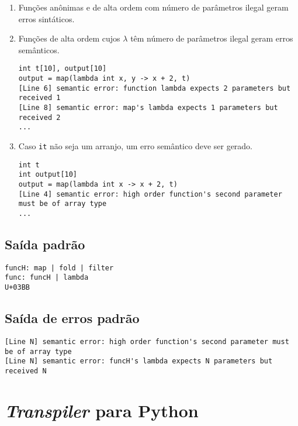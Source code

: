 \documentclass{article}
\newenvironment{smallenum}{
    \vspace{-1mm}
    \begin{enumerate}[label=\roman*.]
    \setlength{\parskip}{0pt}
    \setlength{\itemsep}{2pt}
}{
    \vspace{-2mm}
    \end{enumerate}
}
\begin{document}
\begin{smallenum}

\item Funções anônimas e de alta ordem com número de parâmetros ilegal
    geram erros sintáticos.

\item Funções de alta ordem cujos \texttt{$\lambda$} têm número de
    parâmetros ilegal geram erros semânticos.

\begin{verbatim}
int t[10], output[10]
output = map(lambda int x, y -> x + 2, t)
[Line 6] semantic error: function lambda expects 2 parameters but received 1
[Line 8] semantic error: map's lambda expects 1 parameters but received 2
...
\end{verbatim}

\item Caso \texttt{it} não seja um arranjo, um erro semântico deve ser gerado.

\begin{verbatim}
int t
int output[10]
output = map(lambda int x -> x + 2, t)
[Line 4] semantic error: high order function's second parameter must be of array type
...
\end{verbatim}

\end{smallenum}

\subsection{Saída padrão}

\begin{verbatim}
funcH: map | fold | filter
func: funcH | lambda
U+03BB
\end{verbatim}

\subsection{Saída de erros padrão}

\begin{verbatim}
[Line N] semantic error: high order function's second parameter must be of array type
[Line N] semantic error: funcH's lambda expects N parameters but received N
\end{verbatim}

\section{\emph{Transpiler} para Python}
\end{document}
